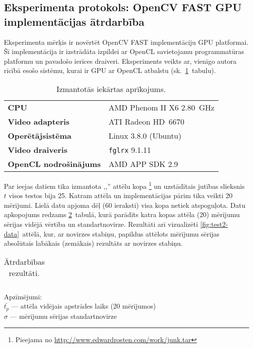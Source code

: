 \subsection{Eksperimenta protokols: OpenCV FAST GPU implementācijas ātrdarbība}\label{appx:test2}
\setcounter{table}{0} %
\setcounter{figure}{0} %
Eksperimenta mērķis ir novērtēt OpenCV FAST implementāciju GPU platformai.
Šī implementācija ir izstrādāta izpildei ar OpenCL savietojamu 
programmatūras platformu un pavadošo ierīces draiveri. Eksperiments veikts
ar, vienīgo autora rīcībā esošo sistēmu, kurai ir GPU ar OpenCL atbalstu
(sk.~\ref{tbl:test2-dev}~tabulu).
\begin{table}[hb]\small
	\centering
	\caption{Izmantotās iekārtas aprīkojums.}
	\label{tbl:test2-dev}
	\vspace{4pt}
	\begin{tabular}{ll}
		\toprule
		\textbf{CPU} & AMD Phenom II X6 2.80~GHz\\
		\textbf{Video adapteris} & ATI Radeon HD~6670 \\
		\midrule
		\textbf{Operētājsistēma} & Linux 3.8.0 (Ubuntu)\\
		\textbf{Video draiveris} & \texttt{fglrx} 9.1.11\\
		\textbf{OpenCL nodrošinājums} & AMD APP SDK 2.9\\
		\bottomrule
	\end{tabular}
\end{table}

Par ieejas datiem tika izmantota ,,'' attēlu kopa%
	\footnote{Pieejama no \url{http://www.edwardrosten.com/work/junk.tar}}
un uzstādītais jutības slieksnis $t$ visos testos bija 25.
Katram attēla un implementācijas pārim tika veikti 20 mērījumi.
Lielā datu apjoma dēļ (60 ieraksti) visa kopa netiek atspoguļota. Datu
apkopojums redzams \ref{tbl:test2-data}~tabulā, kurā parādīts katra kopas
attēla (20) mērījumu sērijas vidējā vērtība un standartnovirze.
Rezultāti arī vizualizēti \ref{fig:test2-data}~attēlā, kur,
ar novirzes stabiņu, papildus attēlots
mērījumu sērijas absolūtais labākais (zemākais) rezultāts ar novirzes stabiņu.
\begin{table}[hb]\footnotesize
	\centering
	\caption{Ātrdarbības rezultāti.}
	\label{tbl:test2-data}
	\vspace{4pt}
	\begin{tabular}{c*{6}{r}}
		\toprule
		
		\bottomrule
	\end{tabular}
	\begin{minipage}{0.5\linewidth}
		\noindent Apzīmējumi:\\
		$\bar{t_p}$ --- attēla vidējais apstrādes laiks (20 mērījumos)\\
		$\sigma$ --- mērījumu sērijas standartnovirze
	\end{minipage}
\end{table}

